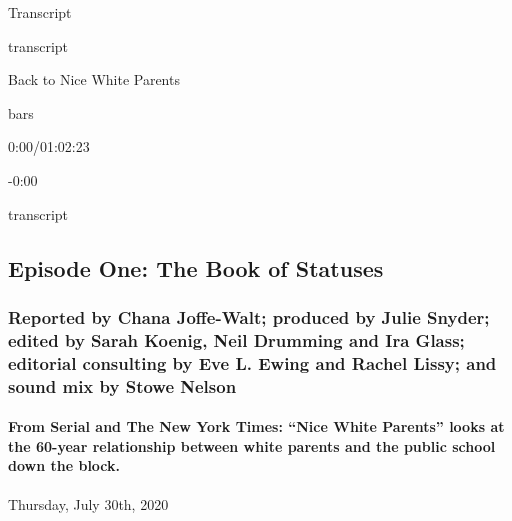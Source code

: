 Transcript

transcript

Back to Nice White Parents

bars

0:00/01:02:23

-0:00

transcript

\hypertarget{episode-one-the-book-of-statuses-2}{%
\subsection{Episode One: The Book of
Statuses}\label{episode-one-the-book-of-statuses-2}}

\hypertarget{reported-by-chana-joffe-walt-produced-by-julie-snyder-edited-by-sarah-koenig-neil-drumming-and-ira-glass-editorial-consulting-by-eve-l-ewing-and-rachel-lissy-and-sound-mix-by-stowe-nelson-1}{%
\subsubsection{Reported by Chana Joffe-Walt; produced by Julie Snyder;
edited by Sarah Koenig, Neil Drumming and Ira Glass; editorial
consulting by Eve L. Ewing and Rachel Lissy; and sound mix by Stowe
Nelson}\label{reported-by-chana-joffe-walt-produced-by-julie-snyder-edited-by-sarah-koenig-neil-drumming-and-ira-glass-editorial-consulting-by-eve-l-ewing-and-rachel-lissy-and-sound-mix-by-stowe-nelson-1}}

\hypertarget{from-serial-and-the-new-york-times-nice-white-parents-looks-at-the-60-year-relationship-between-white-parents-and-the-public-school-down-the-block-2}{%
\paragraph{From Serial and The New York Times: ``Nice White Parents''
looks at the 60-year relationship between white parents and the public
school down the
block.}\label{from-serial-and-the-new-york-times-nice-white-parents-looks-at-the-60-year-relationship-between-white-parents-and-the-public-school-down-the-block-2}}

Thursday, July 30th, 2020

